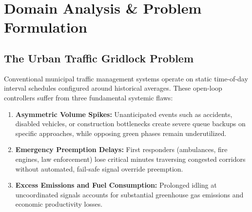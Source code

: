 \documentclass[11pt,a4paper]{report}
\begin{document}
\begin{abstract}
Urban traffic congestion represents a multi-billion dollar economic drain and public safety liability, driven largely by antiquated fixed-time traffic light cycles that fail to adjust to dynamic, non-stationary vehicular flows. The \textbf{SmartFlow Grid} provides an advanced relational database system designed to model physical road intersection topologies, ingest real-time IoT sensor telemetry, and execute real-time automated signal actuation through server-side procedural logic. This project delivers a production-grade dual implementation across \textbf{Oracle Database (PL/SQL)} and \textbf{PostgreSQL (PL/pgSQL)}. The system enforces strict integrity constraints, models dedicated directional lanes and signal phases, computes weighted moving average (WMA) congestion indices, facilitates automated emergency corridor clearance, conducts cursor-driven regional zone surveillance, and maintains an asynchronous shadow audit log. Additionally, this report establishes a formal mathematical normalization proof from an unnormalized Universal Relation $R$ through 1NF, 2NF, 3NF, and Boyce-Codd Normal Form (BCNF).
\end{abstract}

\tableofcontents
\newpage

\chapter{Domain Analysis \& Problem Formulation}

\section{The Urban Traffic Gridlock Problem}
Conventional municipal traffic management systems operate on static time-of-day interval schedules configured around historical averages. These open-loop controllers suffer from three fundamental systemic flaws:
\begin{enumerate}
    \item \textbf{Asymmetric Volume Spikes:} Unanticipated events such as accidents, disabled vehicles, or construction bottlenecks create severe queue backups on specific approaches, while opposing green phases remain underutilized.
    \item \textbf{Emergency Preemption Delays:} First responders (ambulances, fire engines, law enforcement) lose critical minutes traversing congested corridors without automated, fail-safe signal override preemption.
    \item \textbf{Excess Emissions and Fuel Consumption:} Prolonged idling at uncoordinated signals accounts for substantial greenhouse gas emissions and economic productivity losses.
\end{enumerate}
\end{document}
